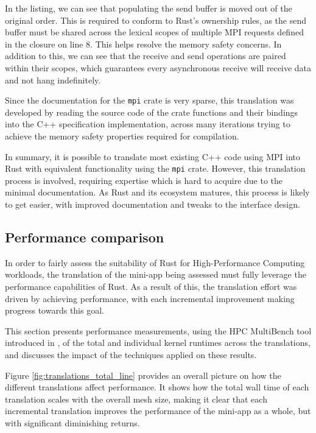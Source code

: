 In the listing, we can see that populating the send buffer is moved out of the original order. This is required to conform to Rust's ownership rules, as the send buffer must be shared across the lexical scopes of multiple MPI requests defined in the closure on line 8. This helps resolve the memory safety concerns. In addition to this, we can see that the receive and send operations are paired within their scopes, which guarantees every asynchronous receive will receive data and not hang indefinitely.

Since the documentation for the \texttt{mpi} crate is very sparse, this translation was developed by reading the source code of the crate functions and their bindings into the C++ specification implementation, across many iterations trying to achieve the memory safety properties required for compilation.

In summary, it is possible to translate most existing C++ code using MPI into Rust with equivalent functionality using the \texttt{mpi} crate. However, this translation process is involved, requiring expertise which is hard to acquire due to the minimal documentation. As Rust and its ecosystem matures, this process is likely to get easier, with improved documentation and tweaks to the interface design.


\subsection{Performance comparison}
\label{sec:translation-performance}


In order to fairly assess the suitability of Rust for High-Performance Computing workloads, the translation of the mini-app being assessed must fully leverage the performance capabilities of Rust. As a result of this, the translation effort was driven by achieving performance, with each incremental improvement making progress towards this goal.

This section presents performance measurements, using the HPC MultiBench tool introduced in , of the total and individual kernel runtimes across the translations, and discusses the impact of the techniques applied on these results.

Figure \ref{fig:translations_total_line} provides an overall picture on how the different translations affect performance. It shows how the total wall time of each translation scales with the overall mesh size, making it clear that each incremental translation improves the performance of the mini-app as a whole, but with significant diminishing returns.

